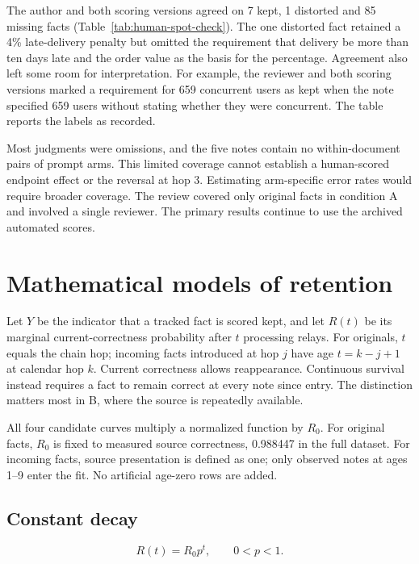 \documentclass[10pt,letterpaper]{amsart}
\numberwithin{equation}{section}
\begin{document}
The author and both scoring versions agreed on 7 kept, 1 distorted and 85 missing facts
(Table~\ref{tab:human-spot-check}). The one distorted fact retained a 4\% late-delivery
penalty but omitted the requirement that delivery be more than ten days late and the
order value as the basis for the percentage. Agreement also left some room for interpretation.
For example, the reviewer and both scoring versions marked a requirement for 659
concurrent users as kept when the note specified 659 users without stating whether
they were concurrent.
The table reports the labels as recorded.

Most judgments were omissions, and the five notes contain no within-document pairs of
prompt arms. This limited coverage cannot establish a human-scored endpoint effect
or the reversal at hop 3. Estimating arm-specific error rates would require broader
coverage. The review covered only original facts in condition A and involved a single
reviewer. The primary results continue to use the archived automated scores.

\section{Mathematical models of retention}
\label{sec:models}

Let $Y$ be the indicator that a tracked fact is scored kept, and let $R(t)$ be its
marginal current-correctness probability after $t$ processing relays. For originals, $t$
equals the chain hop; incoming facts introduced at hop $j$ have age $t=k-j+1$ at calendar
hop $k$. Current correctness allows reappearance. Continuous survival instead requires a
fact to remain correct at every note since entry. The distinction matters most in B, where
the source is repeatedly available.

All four candidate curves multiply a normalized function by $R_0$. For original facts,
$R_0$ is fixed to measured source correctness, 0.988447 in the full dataset. For incoming
facts, source presentation is defined as one; only observed notes at ages 1--9 enter the
fit. No artificial age-zero rows are added.

\subsection*{Constant decay}

\begin{equation}
  \label{eq:constant}
  R(t) = R_0 p^t, \qquad 0 < p < 1.
\end{equation}
\end{document}
